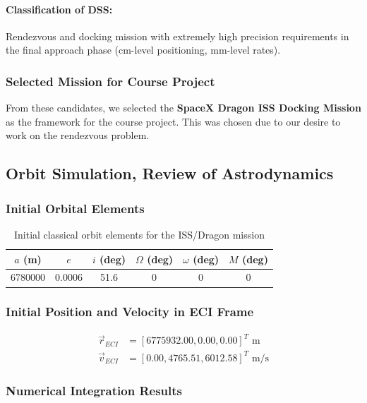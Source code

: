 \paragraph{Classification of DSS:}
Rendezvous and docking mission with extremely high precision requirements in the final approach phase (cm-level positioning, mm-level rates).

\subsubsection{Selected Mission for Course Project}
From these candidates, we selected the \textbf{SpaceX Dragon ISS Docking Mission} as the framework for the course project. This was chosen due to our desire to work on the rendezvous problem.

\subsection{Orbit Simulation, Review of Astrodynamics}
\subsubsection{Initial Orbital Elements}

\begin{table}[H]
    \centering
    \begin{tabular}{cccccc} \hline
        $a$ (m) & $e$ & $i$ (deg) & $\Omega$ (deg) & $\omega$ (deg) & $M$ (deg) \\ \hline 
         6780000 & 0.0006 & 51.6 & 0 & 0 & 0 \\ \hline
    \end{tabular}
    \caption{Initial classical orbit elements for the ISS/Dragon mission}
    \label{tab:iss_ics}
\end{table}

\subsubsection{Initial Position and Velocity in ECI Frame}
\begin{align}
    \vec{r}_{ECI} &= [6775932.00, 0.00, 0.00]^T \text{ m} \\
    \vec{v}_{ECI} &= [0.00, 4765.51, 6012.58]^T \text{ m/s}
\end{align}

\subsubsection{Numerical Integration Results}


